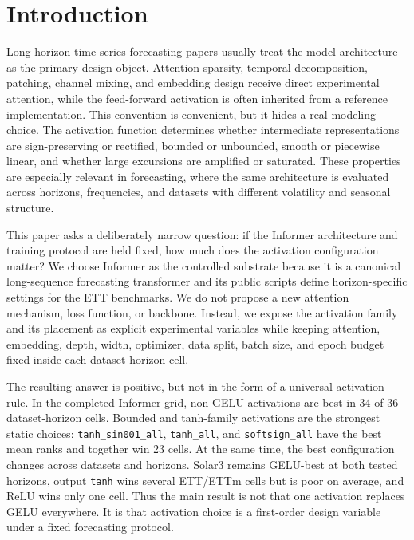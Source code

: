 \section{Introduction}

Long-horizon time-series forecasting papers usually treat the model architecture as the primary design object. Attention sparsity, temporal decomposition, patching, channel mixing, and embedding design receive direct experimental attention, while the feed-forward activation is often inherited from a reference implementation. This convention is convenient, but it hides a real modeling choice. The activation function determines whether intermediate representations are sign-preserving or rectified, bounded or unbounded, smooth or piecewise linear, and whether large excursions are amplified or saturated. These properties are especially relevant in forecasting, where the same architecture is evaluated across horizons, frequencies, and datasets with different volatility and seasonal structure.

This paper asks a deliberately narrow question: if the Informer architecture and training protocol are held fixed, how much does the activation configuration matter? We choose Informer \citep{zhou2021informer} as the controlled substrate because it is a canonical long-sequence forecasting transformer and its public scripts define horizon-specific settings for the ETT benchmarks. We do not propose a new attention mechanism, loss function, or backbone. Instead, we expose the activation family and its placement as explicit experimental variables while keeping attention, embedding, depth, width, optimizer, data split, batch size, and epoch budget fixed inside each dataset-horizon cell.

The resulting answer is positive, but not in the form of a universal activation rule. In the completed Informer grid, non-GELU activations are best in 34 of 36 dataset-horizon cells. Bounded and tanh-family activations are the strongest static choices: \texttt{tanh\_sin001\_all}, \texttt{tanh\_all}, and \texttt{softsign\_all} have the best mean ranks and together win 23 cells. At the same time, the best configuration changes across datasets and horizons. Solar3 remains GELU-best at both tested horizons, output \texttt{tanh} wins several ETT/ETTm cells but is poor on average, and ReLU wins only one cell. Thus the main result is not that one activation replaces GELU everywhere. It is that activation choice is a first-order design variable under a fixed forecasting protocol.

